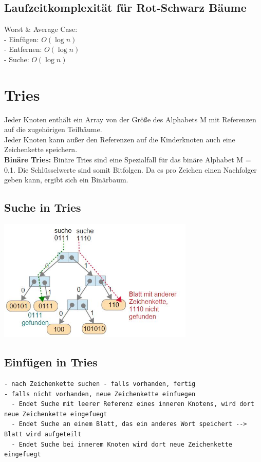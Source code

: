 \documentclass{scrreprt}
\begin{document}
\subsection{Laufzeitkomplexität für Rot-Schwarz Bäume}
Worst \& Average Case:
\\- Einfügen: $O(\log n)$
\\- Entfernen: $O(\log n)$
\\- Suche: $O(\log n)$
\section{Tries}
Jeder Knoten enthält ein Array von der Größe des Alphabets M mit Referenzen auf die zugehörigen Teilbäume.
\\Jeder Knoten kann außer den Referenzen auf die Kinderknoten auch eine Zeichenkette speichern.
\\\textbf{Binäre Tries:}
Binäre Tries sind eine Spezialfall für das binäre Alphabet M = {0,1}. Die Schlüsselwerte sind somit Bitfolgen.
Da es pro Zeichen einen Nachfolger geben kann, ergibt sich ein Binärbaum.
\subsection{Suche in Tries}
\includegraphics[width=0.7\textwidth]{graphics/trie-suche}
\subsection{Einfügen in Tries}
\begin{lstlisting}
- nach Zeichenkette suchen - falls vorhanden, fertig
- falls nicht vorhanden, neue Zeichenkette einfuegen
  - Endet Suche mit leerer Referenz eines inneren Knotens, wird dort neue Zeichenkette eingefuegt
  - Endet Suche an einem Blatt, das ein anderes Wort speichert --> Blatt wird aufgeteilt
  - Endet Suche bei innerem Knoten wird dort neue Zeichenkette eingefuegt
\end{lstlisting}
\end{document}
